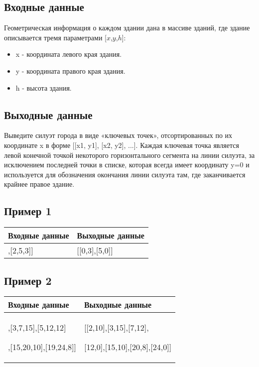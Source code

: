 \documentclass[a4]{article}
\begin{document}
\subsection*{Входные данные}
\label{sec:orge854c50}
Геометрическая информация о каждом здании дана в массиве зданий, где здание описывается тремя параметрами [\(x\),\(y\),\(h\)]:
\begin{itemize}
    \item x - координата левого края здания.
    \item y - координата правого края здания.
    \item h - высота здания.
 \end{itemize}
\subsection*{Выходные данные}
\label{sec:org1ab7414}
Выведите силуэт города в виде «ключевых точек», отсортированных по их координате x в форме [[x1, y1], [x2, y2], ...]. Каждая ключевая точка является левой конечной точкой некоторого горизонтального сегмента на линии силуэта, за исключением последней точки в списке, которая всегда имеет координату y=0 и используется для обозначения окончания линии силуэта там, где заканчивается крайнее правое здание.
\subsection*{Пример 1}
\label{sec:org25482f8}

\begin{table}[H]
\begin{center}
\begin{tabular}{|m{4cm}|m{4cm}|}
\hline
Входные данные & Выходные данные \\ \hline
[[0,2,3],[2,5,3]]
&
[[0,3],[5,0]]
\\ \hline
\end{tabular}
\end{center}
\end{table}
\subsection*{Пример 2}
\begin{table}[H]
\begin{center}
\begin{tabular}{|m{4cm}|m{4cm}|}
\hline
Входные данные & Выходные данные \\ \hline
[[2,9,10],[3,7,15],[5,12,12]

,[15,20,10],[19,24,8]]
&
[[2,10],[3,15],[7,12],

[12,0],[15,10],[20,8],[24,0]]
\\ \hline
\end{tabular}
\end{center}
\end{table}
\end{document}
